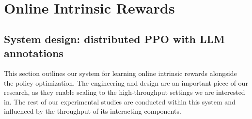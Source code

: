\section{Online Intrinsic Rewards}

\subsection{System design: distributed PPO with LLM annotations}
\label{sec:system}
%
%
This section outlines our system for learning online intrinsic rewards
alongside the policy optimization.
The engineering and design are an important piece of our research, as they enable scaling to the high-throughput settings we are interested in.
The rest of our experimental studies are conducted within this system and influenced by the throughput of its interacting components.
%
%
%
%

